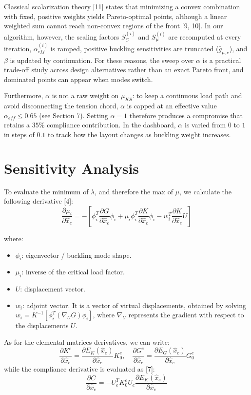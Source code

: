 \documentclass{article}
\begin{document}
Classical scalarization theory [11] states that minimizing a convex combination with fixed, positive weights yields Pareto-optimal points, although a linear weighted sum cannot reach non-convex regions of the front [9, 10]. In our algorithm, however, the scaling factors $S_C^{(i)}$ and $S_\mu^{(i)}$ are recomputed at every iteration, $\alpha_{eff}^{(i)}$ is ramped, positive buckling sensitivities are truncated ($\bar{g}_{\mu,e}$), and $\beta$ is updated by continuation. For these reasons, the sweep over $\alpha$ is a practical trade-off study across design alternatives rather than an exact Pareto front, and dominated points can appear when modes switch.

Furthermore, $\alpha$ is not a raw weight on $\mu_{KS}$: to keep a continuous load path and avoid disconnecting the tension chord, $\alpha$ is capped at an effective value $\alpha_{eff} \leq 0.65$ (see Section 7). Setting $\alpha = 1$ therefore produces a compromise that retains a $35\%$ compliance contribution. In the dashboard, $\alpha$ is varied from $0$ to $1$ in steps of $0.1$ to track how the layout changes as buckling weight increases.

\section{Sensitivity Analysis}

\noindent To evaluate the minimum of $\lambda$, and therefore the max of $\mu$, we calculate the following derivative [4]:
\begin{equation}\label{eq:dmu_dx}
\frac{\partial \mu_i}{\partial \hat{x}_e} = -\left[ \phi_i^T \frac{\partial G}{\partial \hat{x}_e} \phi_i + \mu_i \phi_i^T \frac{\partial K}{\partial \hat{x}_e} \phi_i - w_i^T \frac{\partial K}{\partial \hat{x}_e} U \right]
\end{equation}

where:
\begin{itemize}
    \item $\phi_i$: eigenvector / buckling mode shape.
    \item $\mu_i$: inverse of the critical load factor.
    \item $U$: displacement vector.
    \item $w_i$: adjoint vector. It is a vector of virtual displacements, obtained by solving $w_i = K^{-1}[\phi_i^T (\nabla_U G)\phi_i]$, where $\nabla_U$ represents the gradient with respect to the displacements $U$.
\end{itemize}
\noindent As for the elemental matrices derivatives, we can write:
\begin{equation}\label{eq:dk_dg_dx}
\frac{\partial K^e}{\partial \hat{x}_e} = \frac{\partial E_K(\hat{x}_e)}{\partial \hat{x}_e} K_0^e, \quad \frac{\partial G^e}{\partial \hat{x}_e} = \frac{\partial E_G(\hat{x}_e)}{\partial \hat{x}_e} G_0^e
\end{equation}
\noindent while the compliance derivative is evaluated as [7]:
\begin{equation}\label{eq:dc_dx}
\frac{\partial C}{\partial \hat{x}_e} = -U_e^T K_0^e U_e \frac{\partial E_K(\hat{x}_e)}{\partial \hat{x}_e}
\end{equation}
\end{document}
